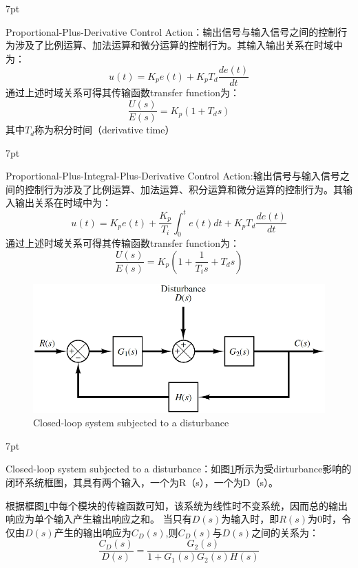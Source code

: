 \documentclass{article}
\numberwithin{equation}{section}
\numberwithin{figure}{section}
\newenvironment{formal}{%
\def\FrameCommand{%
\hspace{1pt}%
{\color{DarkBlue}\vrule width 2pt}%
{\color{formalshade}\vrule width 4pt}%
\colorbox{formalshade}%
}%
\MakeFramed{\advance\hsize-\width\FrameRestore}%
\noindent\hspace{-4.55pt}%
\begin{adjustwidth}{}{7pt}%
\vspace{2pt}\vspace{2pt}%
}
{%
\vspace{2pt}\end{adjustwidth}\endMakeFramed%
}
\begin{document}
\begin{formal}
    Proportional-Plus-Derivative Control Action：输出信号与输入信号之间的控制行为涉及了比例运算、加法运算和微分运算的控制行为。其输入输出关系在时域中为：
    \begin{equation}
        u(t)=K_pe(t)+K_pT_d\frac{de(t)}{dt}
    \end{equation}
    通过上述时域关系可得其传输函数transfer function为：
    \begin{equation}
        \frac{U(s)}{E(s)}=K_p(1+T_ds)
    \end{equation}
    其中$T_d$称为积分时间（derivative time）
\end{formal}

\begin{formal}
    Proportional-Plus-Integral-Plus-Derivative Control Action:输出信号与输入信号之间的控制行为涉及了比例运算、加法运算、积分运算和微分运算的控制行为。其输入输出关系在时域中为：
    \begin{equation}
        u(t)=K_pe(t)+\frac{K_p}{T_i}\int_{0}^{t}e(t)dt+K_pT_d\frac{de(t)}{dt}
    \end{equation}
    通过上述时域关系可得其传输函数transfer function为：
    \begin{equation}
        \frac{U(s)}{E(s)}=K_p(1+\frac{1}{T_is}+T_ds)
    \end{equation}
\end{formal}

\begin{figure}
    \centering
    \includegraphics[width=.6\textwidth]{Chapter2/Close-loop system under disturbance.png} %
    \caption{Closed-loop system subjected to a disturbance} %
    \label{Closed-loop system subjected to a disturbance} %
\end{figure}

\begin{formal}
    Closed-loop system subjected to a disturbance：如图\ref{Closed-loop system subjected to a disturbance}所示为受dirturbance影响的闭环系统框图，其具有两个输入，一个为R（s），一个为D（s）。
\end{formal}
根据框图\ref{Closed-loop system subjected to a disturbance}中每个模块的传输函数可知，该系统为线性时不变系统，因而总的输出响应为单个输入产生输出响应之和。
当只有$D(s)$为输入时，即$R(s)$为0时，令仅由$D(s)$产生的输出响应为$C_D(s)$,则$C_D(s)$与$D(s)$之间的关系为：
\begin{equation}
    \frac{C_D(s)}{D(s)}=\frac{G_2(s)}{1+G_1(s)G_2(s)H(s)}
\end{equation}
\end{document}
